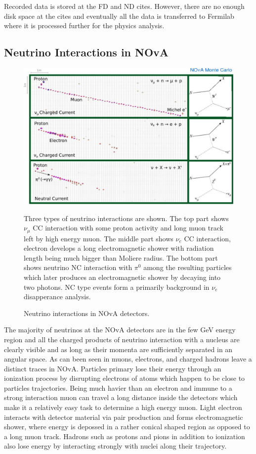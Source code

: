Recorded data is stored at the FD and ND cites. However, there are no enough disk space at the cites and
eventually all the data is transferred to Fermilab where it is processed further for the physics analysis.

\subsection{Neutrino Interactions in NOvA}
\begin{figure}
\includegraphics[width=1.0\textwidth]{figures/Det_topologies.pdf}\\%
\caption{Neutrino interactions in NOvA detectors.}
{Three types of neutrino interactions are shown. The top part shows $\nu_\mu$ CC interaction with some
proton activity and long muon track left by high energy muon. The middle part shows $\nu_e$ CC interaction,
electron develops a long electromagnetic shower with radiation length being much bigger than Moliere radius.
The bottom part shows neutrino NC interaction with $\pi^0$ among the resulting particles which later produces
an electromagnetic shower by decaying into two photons. NC type events form a primarily background in $\nu_e$
disapperance analysis.} \label{Topologies}
\end{figure}
The majority of neutrinos at the NOvA detectors are in the few GeV energy region and all the charged 
products of neutrino interaction with a nucleus are clearly visible and as long as their momenta are 
sufficiently separated in an angular space. As can been seen in  muons, electrons, and charged 
hadrons leave a distinct traces in NOvA. Particles primary lose their energy through an ionization 
process by disrupting electrons of atoms which happen to be close to particles trajectories. Being 
much havier than an electron and immune to a strong interaction muon can travel a long distance inside 
the detectors which make it a relatively easy task to determine a high energy muon. Light electron interacts
with detector material via pair production and forms electromagnetic shower, where energy is depossed in 
a rather conical shaped region as opposed to a long muon track. Hadrons such as protons and pions in 
addition to ionization also lose energy by interacting strongly with nuclei along their trajectory. 

